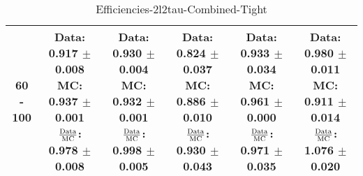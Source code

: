 \documentclass[final,letterpaper,twoside,12pt]{article}
\begin{document}
\begin{table}[htbp]
\begin{adjustwidth}{-4em}{-4em}
\begin{tabular}{|c|c|c|c|c|c|}
60 - 100 & \parbox[c]{1.1 in}{ \scriptsize  Data: 0.917 $\pm$ 0.008 \newline MC: 0.937 $\pm$ 0.001 \newline $\frac{\rm{Data}}{\rm{MC}}$: 0.978 $\pm$ 0.008} & \parbox[c]{1.1 in}{ \scriptsize  Data: 0.930 $\pm$ 0.004 \newline MC: 0.932 $\pm$ 0.001 \newline $\frac{\rm{Data}}{\rm{MC}}$: 0.998 $\pm$ 0.005} & \parbox[c]{1.1 in}{ \scriptsize  Data: 0.824 $\pm$ 0.037 \newline MC: 0.886 $\pm$ 0.010 \newline $\frac{\rm{Data}}{\rm{MC}}$: 0.930 $\pm$ 0.043} & \parbox[c]{1.1 in}{ \scriptsize  Data: 0.933 $\pm$ 0.034 \newline MC: 0.961 $\pm$ 0.000 \newline $\frac{\rm{Data}}{\rm{MC}}$: 0.971 $\pm$ 0.035} & \parbox[c]{1.1 in}{ \scriptsize  Data: 0.980 $\pm$ 0.011 \newline MC: 0.911 $\pm$ 0.014 \newline $\frac{\rm{Data}}{\rm{MC}}$: 1.076 $\pm$ 0.020}\\ \hline 
\end{tabular}
\caption {Efficiencies-2l2tau-Combined-Tight}
\label{tab:cqdata0}
\end{adjustwidth}\end{table}
\end{document}

